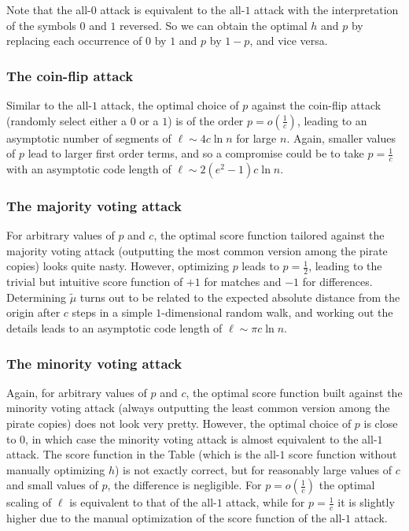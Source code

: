 \documentclass[10pt,a4paper,twocolumn]{article}
\begin{document}
Note that the all-$0$ attack is equivalent to the all-$1$ attack with the interpretation of the symbols $0$ and $1$ reversed. So we can obtain the optimal $h$ and $p$ by replacing each occurrence of $0$ by $1$ and $p$ by $1 - p$, and vice versa. 

\subsubsection{The coin-flip attack}
Similar to the all-$1$ attack, the optimal choice of $p$ against the coin-flip attack (randomly select either a $0$ or a $1$) is of the order $p = o(\frac{1}{c})$, leading to an asymptotic number of segments of $\ell \sim 4 c \ln n$ for large $n$. Again, smaller values of $p$ lead to larger first order terms, and so a compromise could be to take $p = \frac{1}{c}$ with an asymptotic code length of $\ell \sim 2(e^2 - 1) c \ln n$. 

\subsubsection{The majority voting attack}
For arbitrary values of $p$ and $c$, the optimal score function tailored against the majority voting attack (outputting the most common version among the pirate copies) looks quite nasty. However, optimizing $p$ leads to $p = \frac{1}{2}$, leading to the trivial but intuitive score function of $+1$ for matches and $-1$ for differences. Determining $\tilde{\mu}$ turns out to be related to the expected absolute distance from the origin after $c$ steps in a simple $1$-dimensional random walk, and working out the details leads to an asymptotic code length of $\ell \sim \pi c \ln n$.

\subsubsection{The minority voting attack}
Again, for arbitrary values of $p$ and $c$, the optimal score function built against the minority voting attack (always outputting the least common version among the pirate copies) does not look very pretty. However, the optimal choice of $p$ is close to $0$, in which case the minority voting attack is almost equivalent to the all-$1$ attack. The score function in the Table (which is the all-$1$ score function without manually optimizing $h$) is not exactly correct, but for reasonably large values of $c$ and small values of $p$, the difference is negligible. For $p = o(\frac{1}{c})$ the optimal scaling of $\ell$ is equivalent to that of the all-$1$ attack, while for $p = \frac{1}{c}$ it is slightly higher due to the manual optimization of the score function of the all-$1$ attack.
\end{document}
